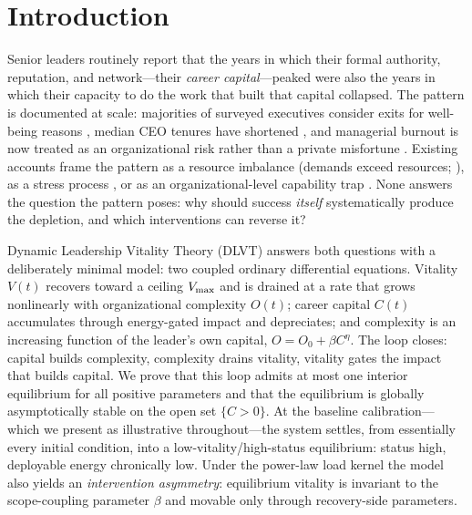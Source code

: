 \section{Introduction}
\label{sec:introduction}

Senior leaders routinely report that the years in which their formal
authority, reputation, and network---their \emph{career capital}---peaked
were also the years in which their capacity to do the work that built that
capital collapsed. The pattern is documented at scale: majorities of
surveyed executives consider exits for well-being reasons
\citep{deloitte2022wellbeing}, median CEO tenures have shortened
\citep{conference2023tenure}, and managerial burnout is now treated as an
organizational risk rather than a private misfortune
\citep{maslach2001job,veldhuis2020burnout,muller2026systematic,tu2025dancing}.
Existing accounts frame the pattern as a resource imbalance (demands exceed
resources; \citealp{demerouti2001job,bakker2017jdr}), as a stress process
\citep{hobfoll1989conservation}, or as an organizational-level capability
trap \citep{repenning2001nobody,repenning2002capability}. None answers the
question the pattern poses: why should success \emph{itself} systematically
produce the depletion, and which interventions can reverse it?

Dynamic Leadership Vitality Theory (DLVT) answers both questions with a
deliberately minimal model: two coupled ordinary differential equations.
Vitality $V(t)$ recovers toward a ceiling $V_{\max}$ and is drained at a rate
that grows nonlinearly with organizational complexity $O(t)$; career capital
$C(t)$ accumulates through energy-gated impact and depreciates; and
complexity is an increasing function of the leader's own capital,
$O = O_0 + \beta C^{\eta}$. The loop closes: capital builds complexity,
complexity drains vitality, vitality gates the impact that builds capital.
We prove that this loop admits at most one interior equilibrium for all
positive parameters and that the equilibrium is globally asymptotically
stable on the open set $\{C>0\}$. At the baseline calibration---which we
present as illustrative throughout---the system settles, from essentially
every initial condition, into a low-vitality/high-status equilibrium:
status high, deployable energy chronically low. Under the power-law load
kernel the model also yields an \emph{intervention asymmetry}: equilibrium
vitality is invariant to the scope-coupling parameter $\beta$ and movable
only through recovery-side parameters.

